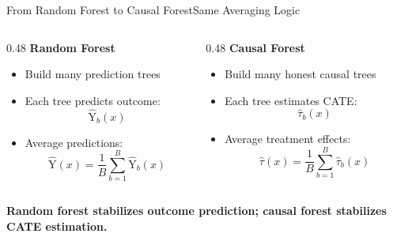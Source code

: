 \documentclass[hyperref={pdfpagelabels=false}]{beamer}
\begin{document}
\begin{frame}{From Random Forest to Causal Forest}{Same Averaging Logic}

\begin{columns}[T]
\begin{column}{0.48\textwidth}
\textbf{Random Forest}
\begin{itemize}
  \item Build many prediction trees
  \vspace{0.1cm}
  \item Each tree predicts outcome:
  \[
    \hat{\mathrm{Y}}_b(x)
  \]
  \vspace{0.1cm}
  \item Average predictions:
  \[
    \hat{\mathrm{Y}}(x)=\frac{1}{B}\sum_{b=1}^{B}\hat{\mathrm{Y}}_b(x)
  \]
\end{itemize}
\end{column}

\begin{column}{0.48\textwidth}
\textbf{Causal Forest}
\begin{itemize}
  \item Build many honest causal trees
  \vspace{0.1cm}
  \item Each tree estimates CATE:
  \[
    \hat{\tau}_b(x)
  \]
  \vspace{0.1cm}
  \item Average treatment effects:
  \[
    \hat{\tau}(x)=\frac{1}{B}\sum_{b=1}^{B}\hat{\tau}_b(x)
  \]
\end{itemize}
\end{column}
\end{columns}

\vspace{0.2cm}
\begin{center}
\textbf{Random forest stabilizes outcome prediction; causal forest stabilizes CATE estimation.}
\end{center}

\end{frame}
\end{document}
